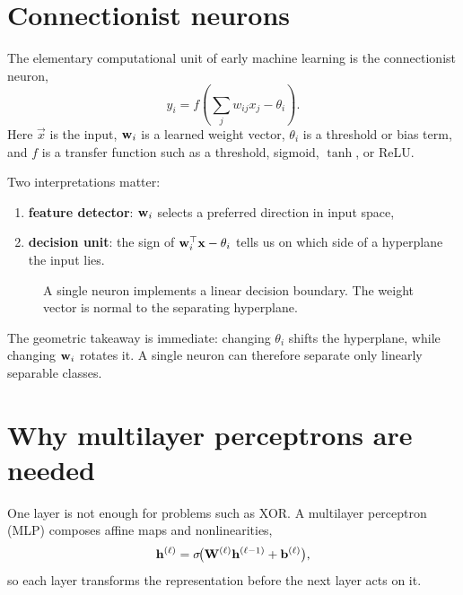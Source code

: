 \section{Connectionist neurons}

The elementary computational unit of early machine learning is the connectionist neuron,
\[
  y_i = f\!\left(\sum_j w_{ij} x_j - \theta_i\right).
\]
Here $\vec{x}$ is the input, $\mathbf{w}_i$ is a learned weight vector, $\theta_i$ is a threshold or bias term, and $f$ is a transfer function such as a threshold, sigmoid, $\tanh$, or ReLU.

Two interpretations matter:
\begin{enumerate}
  \item \textbf{feature detector}: $\mathbf{w}_i$ selects a preferred direction in input space,
  \item \textbf{decision unit}: the sign of $\mathbf{w}_i^\top \mathbf{x} - \theta_i$ tells us on which side of a hyperplane the input lies.
\end{enumerate}

\begin{figure}[t]
\centering
{}
\caption{A single neuron implements a linear decision boundary. The weight vector is normal to the separating hyperplane.}
\end{figure}

The geometric takeaway is immediate: changing $\theta_i$ shifts the hyperplane, while changing $\mathbf{w}_i$ rotates it. A single neuron can therefore separate only linearly separable classes.

\section{Why multilayer perceptrons are needed}

One layer is not enough for problems such as XOR. A multilayer perceptron (MLP) composes affine maps and nonlinearities,
\[
  \mathbf{h}^{(\ell)} = \sigma\!\bigl(\mathbf{W}^{(\ell)} \mathbf{h}^{(\ell-1)} + \mathbf{b}^{(\ell)}\bigr),
\]
so each layer transforms the representation before the next layer acts on it.

